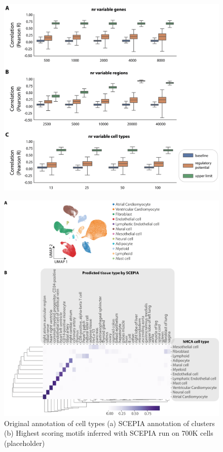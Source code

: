 \begin{figure}
    \centering
    \includegraphics[width=\linewidth]{ch.scepia/imgs/BulkBenchmarks_MvS_Myriad_SuppFig1.png}
    \caption{}
    \label{fig:bulkbenchmark}
\end{figure}
\begin{figure}
    \centering
    \includegraphics[width=\linewidth]{ch.scepia/imgs/SCEPIA_Annotation_allCells_Myriad_v5_SuppFigAnno.png}
    \caption{Original annotation of cell types (a) SCEPIA annotation of clusters (b) Highest scoring motifs inferred with SCEPIA run on 700K cells (placeholder) }
    \label{fig:scepia_annotation1}
\end{figure}

